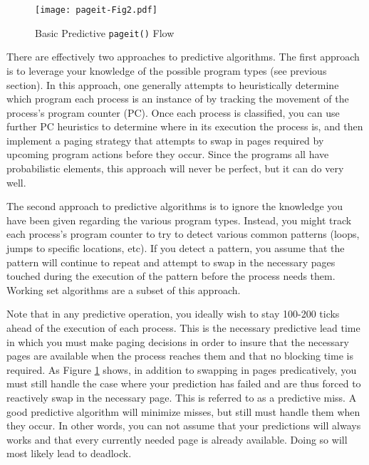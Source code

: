 \documentclass[12pt]{article}
\begin{document}
\begin{figure}[htbp]
  \begin{center}
    \texttt{[image: pageit-Fig2.pdf]}
    \caption{Basic Predictive \texttt{pageit()} Flow}
    \label{fig:pageit-predictive}
  \end{center}
\end{figure}

There are effectively two approaches to predictive algorithms. The
first approach is to leverage your knowledge of the possible program
types (see previous section). In this approach, one generally attempts
to heuristically determine which program each process is an instance of
by tracking the movement of the process's program counter (PC). Once each
process is classified, you can use further PC heuristics to determine where
in its execution the process is, and then implement a paging strategy
that attempts to swap in pages required by upcoming program actions
before they occur. Since the programs all have probabilistic elements,
this approach will never be perfect, but it can do very well.

The second approach to predictive algorithms is to ignore the
knowledge you have been given regarding the various program
types. Instead, you might track each process's program counter to try
to detect various common patterns (loops, jumps to specific locations,
etc). If you detect a pattern, you assume that the pattern will continue to
repeat and attempt to swap in the necessary pages touched during the
execution of the pattern before the process needs them.
Working set algorithms are a subset of this approach.

Note that in any predictive operation, you ideally wish to stay
100-200 ticks ahead of the execution of each process. This is the
necessary predictive lead time in which you must make paging decisions
in order to insure that the necessary pages are available when the
process reaches them and that no blocking time is required. As Figure
\ref{fig:pageit-predictive} shows, in addition to swapping in pages
predicatively, you must still handle the case where your prediction has
failed and are thus forced to reactively swap in the necessary
page. This is referred to as a predictive miss. A good predictive
algorithm will minimize misses, but still must handle them when they
occur. In other words, you can not assume that your predictions will
always works and that every currently needed page is already
available. Doing so will most likely lead to deadlock.
\end{document}
